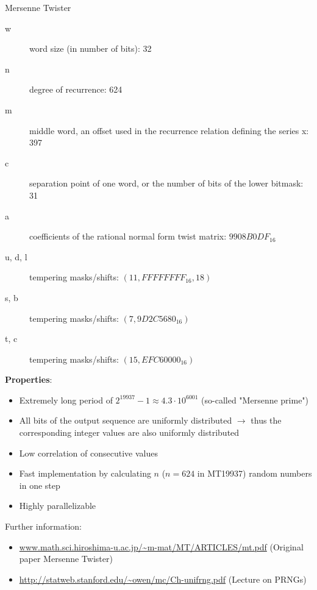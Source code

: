 \documentclass[11pt,compress,t,notes=noshow, xcolor=table]{beamer}
\begin{document}
\begin{vbframe}{Mersenne Twister}
\begin{description}
  \item[w] word size (in number of bits): 32
  \item[n] degree of recurrence: 624
  \item[m] middle word, an offset used in the recurrence relation defining the series x: 397
  \item[c] separation point of one word, or the number of bits of the lower bitmask: 31
  \item[a] coefficients of the rational normal form twist matrix: $9908B0DF_{16}$
  \item[u, d, l] tempering masks/shifts: $(11, FFFFFFFF_{16}, 18)$
  \item[s, b] tempering masks/shifts: $(7, 9D2C5680_{16})$
  \item[t, c] tempering masks/shifts:  $(15, EFC60000_{16})$
\end{description}

\framebreak


\textbf{Properties}:

\begin{itemize}
	\item Extremely long period of $2^{19937} - 1\approx 4.3 \cdot 10^{6001}$ (so-called "Mersenne prime")
	\item All bits of the output sequence are uniformly distributed $\to$ thus the corresponding integer values are also uniformly distributed
	\item Low correlation of consecutive values
	\item Fast implementation by calculating $n$ ($n = 624$ in MT19937) random numbers in one step
	\item Highly parallelizable
\end{itemize}

\lz

\footnotesize{
Further information:
\begin{itemize}
	\item \url{www.math.sci.hiroshima-u.ac.jp/~m-mat/MT/ARTICLES/mt.pdf} (Original paper Mersenne Twister)
	\item \url{http://statweb.stanford.edu/~owen/mc/Ch-unifrng.pdf} (Lecture on PRNGs)
\end{itemize}
}

\end{vbframe}


\end{document}
